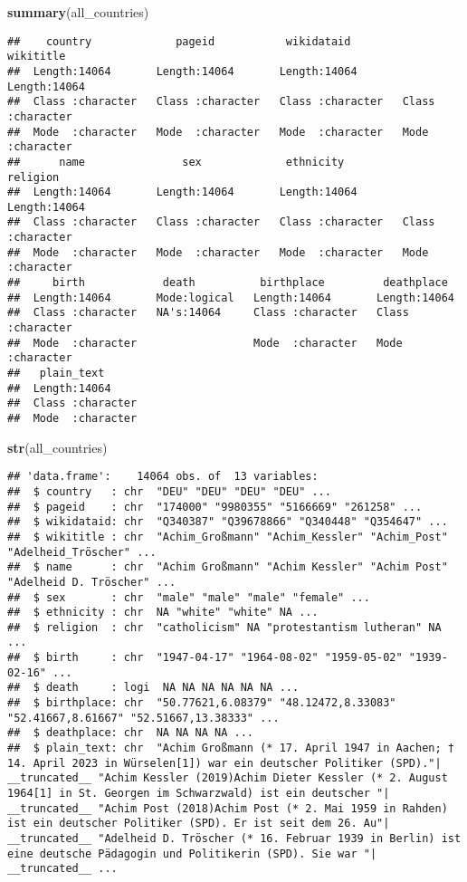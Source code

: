\documentclass[
]{article}
\newenvironment{Shaded}{\begin{snugshade}}{\end{snugshade}}
\newcommand{\FunctionTok}[1]{\textcolor[rgb]{0.13,0.29,0.53}{\textbf{#1}}}
\newcommand{\NormalTok}[1]{#1}
\begin{document}
\begin{Shaded}
\begin{Highlighting}[]
\FunctionTok{summary}\NormalTok{(all\_countries)}
\end{Highlighting}
\end{Shaded}

\begin{verbatim}
##    country             pageid           wikidataid         wikititle        
##  Length:14064       Length:14064       Length:14064       Length:14064      
##  Class :character   Class :character   Class :character   Class :character  
##  Mode  :character   Mode  :character   Mode  :character   Mode  :character  
##      name               sex             ethnicity           religion        
##  Length:14064       Length:14064       Length:14064       Length:14064      
##  Class :character   Class :character   Class :character   Class :character  
##  Mode  :character   Mode  :character   Mode  :character   Mode  :character  
##     birth            death          birthplace         deathplace       
##  Length:14064       Mode:logical   Length:14064       Length:14064      
##  Class :character   NA's:14064     Class :character   Class :character  
##  Mode  :character                  Mode  :character   Mode  :character  
##   plain_text       
##  Length:14064      
##  Class :character  
##  Mode  :character
\end{verbatim}

\begin{Shaded}
\begin{Highlighting}[]
\FunctionTok{str}\NormalTok{(all\_countries)}
\end{Highlighting}
\end{Shaded}

\begin{verbatim}
## 'data.frame':    14064 obs. of  13 variables:
##  $ country   : chr  "DEU" "DEU" "DEU" "DEU" ...
##  $ pageid    : chr  "174000" "9980355" "5166669" "261258" ...
##  $ wikidataid: chr  "Q340387" "Q39678866" "Q340448" "Q354647" ...
##  $ wikititle : chr  "Achim_Großmann" "Achim_Kessler" "Achim_Post" "Adelheid_Tröscher" ...
##  $ name      : chr  "Achim Großmann" "Achim Kessler" "Achim Post" "Adelheid D. Tröscher" ...
##  $ sex       : chr  "male" "male" "male" "female" ...
##  $ ethnicity : chr  NA "white" "white" NA ...
##  $ religion  : chr  "catholicism" NA "protestantism lutheran" NA ...
##  $ birth     : chr  "1947-04-17" "1964-08-02" "1959-05-02" "1939-02-16" ...
##  $ death     : logi  NA NA NA NA NA NA ...
##  $ birthplace: chr  "50.77621,6.08379" "48.12472,8.33083" "52.41667,8.61667" "52.51667,13.38333" ...
##  $ deathplace: chr  NA NA NA NA ...
##  $ plain_text: chr  "Achim Großmann (* 17. April 1947 in Aachen; † 14. April 2023 in Würselen[1]) war ein deutscher Politiker (SPD)."| __truncated__ "Achim Kessler (2019)Achim Dieter Kessler (* 2. August 1964[1] in St. Georgen im Schwarzwald) ist ein deutscher "| __truncated__ "Achim Post (2018)Achim Post (* 2. Mai 1959 in Rahden) ist ein deutscher Politiker (SPD). Er ist seit dem 26. Au"| __truncated__ "Adelheid D. Tröscher (* 16. Februar 1939 in Berlin) ist eine deutsche Pädagogin und Politikerin (SPD). Sie war "| __truncated__ ...
\end{verbatim}
\end{document}
